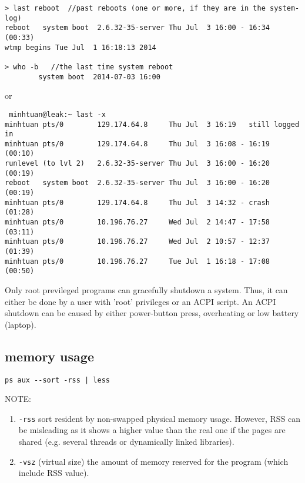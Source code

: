 \begin{verbatim}
> last reboot  //past reboots (one or more, if they are in the system-log)
reboot   system boot  2.6.32-35-server Thu Jul  3 16:00 - 16:34  (00:33)    
wtmp begins Tue Jul  1 16:18:13 2014

> who -b   //the last time system reboot
        system boot  2014-07-03 16:00

\end{verbatim}


or
\begin{verbatim}
 minhtuan@leak:~ last -x
minhtuan pts/0        129.174.64.8     Thu Jul  3 16:19   still logged in   
minhtuan pts/0        129.174.64.8     Thu Jul  3 16:08 - 16:19  (00:10)    
runlevel (to lvl 2)   2.6.32-35-server Thu Jul  3 16:00 - 16:20  (00:19)    
reboot   system boot  2.6.32-35-server Thu Jul  3 16:00 - 16:20  (00:19)    
minhtuan pts/0        129.174.64.8     Thu Jul  3 14:32 - crash  (01:28)    
minhtuan pts/0        10.196.76.27     Wed Jul  2 14:47 - 17:58  (03:11)    
minhtuan pts/0        10.196.76.27     Wed Jul  2 10:57 - 12:37  (01:39)    
minhtuan pts/0        10.196.76.27     Tue Jul  1 16:18 - 17:08  (00:50)    

\end{verbatim}

Only root previleged programs can gracefully shutdown a system. Thus, it can
either be done by a user with 'root' privileges	or an ACPI script.
An ACPI shutdown can be caused by either power-button press, overheating or low
battery (laptop).

\subsection{memory usage}

\begin{verbatim}
ps aux --sort -rss | less
\end{verbatim}
NOTE: 
\begin{enumerate}
  \item \verb!-rss! sort resident by non-swapped physical memory usage. However,
  RSS can be misleading as it shows a higher value than the real one if the
  pages are shared (e.g. several threads or dynamically linked libraries).
  
  \item \verb!-vsz! (virtual size) the amount of memory reserved for the program
  (which include RSS value).
\end{enumerate} 

